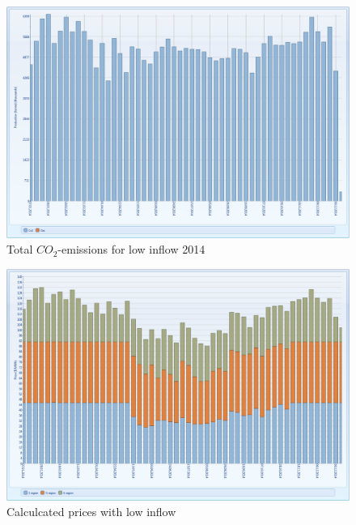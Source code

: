 \documentclass{article}
\begin{document}
\begin{figure}[htbp]
\begin{center}
\includegraphics[width=13cm,keepaspectratio=true]{figures/drycase/MTCO2dry}
\caption{Total $CO_2$-emissions for low inflow 2014}
\label{fig:MTemissionsdry}
\end{center}
\end{figure}
\begin{figure}[htbp]
\begin{center}
\includegraphics[width=13cm,keepaspectratio=true]{figures/drycase/MTpricesdry}
\caption{Calculcated prices with low inflow}
\label{fig:MTpriceslow}
\end{center}
\end{figure}
\end{document}
